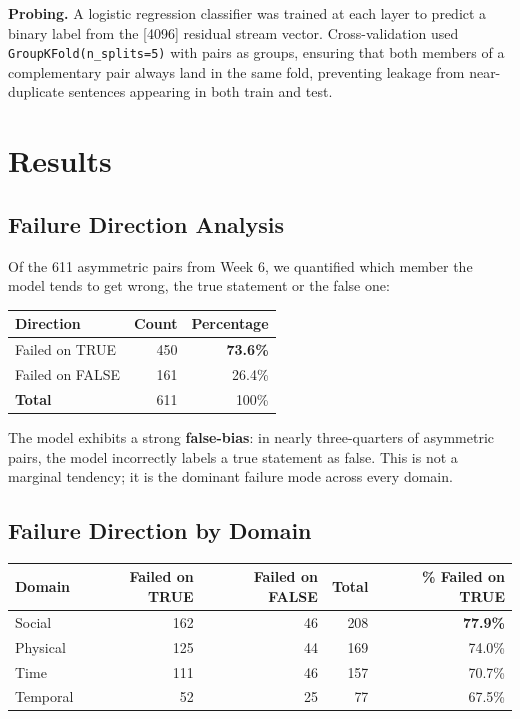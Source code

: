 \documentclass[11pt]{article}
\begin{document}
\textbf{Probing.} A logistic regression classifier was trained at each layer to predict a binary label from the [4096] residual stream vector. Cross-validation used \texttt{GroupKFold(n\_splits=5)} with pairs as groups, ensuring that both members of a complementary pair always land in the same fold, preventing leakage from near-duplicate sentences appearing in both train and test.

\section*{Results}

\subsection*{Failure Direction Analysis}

Of the 611 asymmetric pairs from Week 6, we quantified which member the model tends to get wrong, the true statement or the false one:

\begin{center}
\begin{tabular}{l r r}
\toprule
\textbf{Direction} & \textbf{Count} & \textbf{Percentage} \\
\midrule
Failed on TRUE  & 450 & \textbf{73.6\%} \\
Failed on FALSE & 161 & 26.4\% \\
\midrule
\textbf{Total} & 611 & 100\% \\
\bottomrule
\end{tabular}
\end{center}

The model exhibits a strong \textbf{false-bias}: in nearly three-quarters of asymmetric pairs, the model incorrectly labels a true statement as false. This is not a marginal tendency; it is the dominant failure mode across every domain.

\subsection*{Failure Direction by Domain}

\begin{center}
\begin{tabular}{l r r r r}
\toprule
\textbf{Domain} & \textbf{Failed on TRUE} & \textbf{Failed on FALSE} & \textbf{Total} & \textbf{\% Failed on TRUE} \\
\midrule
Social   & 162 & 46 & 208 & \textbf{77.9\%} \\
Physical & 125 & 44 & 169 & 74.0\% \\
Time     & 111 & 46 & 157 & 70.7\% \\
Temporal &  52 & 25 &  77 & 67.5\% \\
\bottomrule
\end{tabular}
\end{center}
\end{document}

